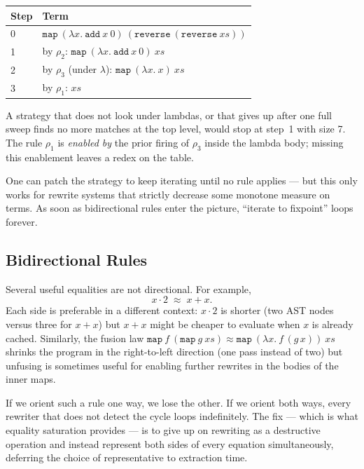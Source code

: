 \documentclass[11pt,a4paper]{article}
\begin{document}
\begin{center}
\begin{tabular}{ll}
\toprule
Step & Term \\
\midrule
0 & $\mathtt{map}\ (\lambda x.\ \mathtt{add}\ x\ 0)\ (\mathtt{reverse}\ (\mathtt{reverse}\ xs))$ \\
1 & by $\rho_2$: $\mathtt{map}\ (\lambda x.\ \mathtt{add}\ x\ 0)\ xs$ \\
2 & by $\rho_3$ (under $\lambda$): $\mathtt{map}\ (\lambda x.\ x)\ xs$ \\
3 & by $\rho_1$: $xs$ \\
\bottomrule
\end{tabular}
\end{center}

A strategy that does not look under lambdas, or that gives up after one full sweep finds no more matches at the top level, would stop at step~1 with size 7. The rule $\rho_1$ is \emph{enabled by} the prior firing of $\rho_3$ inside the lambda body; missing this enablement leaves a redex on the table.

One can patch the strategy to keep iterating until no rule applies — but this only works for rewrite systems that strictly decrease some monotone measure on terms. As soon as bidirectional rules enter the picture, ``iterate to fixpoint'' loops forever.

\subsection{Bidirectional Rules}\label{sec:bidirectional}

Several useful equalities are not directional. For example,
\[
  x \cdot 2 \;\approx\; x + x.
\]
Each side is preferable in a different context: $x \cdot 2$ is shorter (two AST nodes versus three for $x + x$) but $x + x$ might be cheaper to evaluate when $x$ is already cached. Similarly, the fusion law $\mathtt{map}\ f\ (\mathtt{map}\ g\ xs) \approx \mathtt{map}\ (\lambda x.\ f\,(g\,x))\ xs$ shrinks the program in the right-to-left direction (one pass instead of two) but unfusing is sometimes useful for enabling further rewrites in the bodies of the inner maps.

If we orient such a rule one way, we lose the other. If we orient both ways, every rewriter that does not detect the cycle loops indefinitely. The fix — which is what equality saturation provides — is to give up on rewriting as a destructive operation and instead represent both sides of every equation simultaneously, deferring the choice of representative to extraction time.
\end{document}
